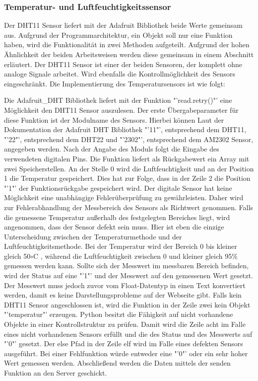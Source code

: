 \subsubsection*{Temperatur- und Luftfeuchtigkeitssensor}
	Der DHT11 Sensor liefert mit der Adafruit Bibliothek beide Werte gemeinsam aus. Aufgrund der Programmarchitektur, ein Objekt soll nur eine Funktion haben, wird die Funktionalität in zwei Methoden aufgeteilt. Aufgrund der hohen Ähnlichkeit der beiden Arbeitsweisen werden diese gemeinsam in einem Abschnitt erläutert. Der DHT11 Sensor ist einer der beiden Sensoren, der komplett ohne analoge Signale arbeitet. Wird ebenfalls die Kontrollmöglichkeit des Sensors eingeschränkt. Die Implementierung des Temperatursensors ist wie folgt:
	
	Die Adafruit\_DHT Bibliothek liefert mit der Funktion "'read.retry()"' eine Möglichkeit den DHT11 Sensor auszulesen. Der erste Übergabeparameter für diese Funktion ist der Modulname des Sensors. Hierbei können Laut der Dokumentation der Adafruit DHT Bibliothek\cite{Adafruit47:online} "'11"', entsprechend dem DHT11, "'22"', entsprechend dem DHT22 und "'2302"', entsprechend dem AM2302 Sensor, angegeben werden. Nach der Angabe des Moduls folgt die Eingabe des verwendeten digitalen Pins. Die Funktion liefert als Rückgabewert ein Array mit zwei Speicherstellen. An der Stelle 0 wird die Luftfeuchtigkeit und an der Position 1 die Temperatur gespeichert. Dies hat zur Folge, dass in der Zeile 2 die Position "'1"' der Funktionsrückgabe gespeichert wird. Der digitale Sensor hat keine Möglichkeit eine unabhängige Fehlerüberprüfung zu gewährleisten. Daher wird zur Fehlerabhandlung der Messbereich des Sensors als Richtwert genommen. Falls die gemessene Temperatur außerhalb des festgelegten Bereiches liegt, wird angenommen, dass der Sensor defekt sein muss. Hier ist eben die einzige Unterscheidung zwischen der Temperaturmethode und der Luftfeuchtigkeitsmethode. Bei der Temperatur wird der Bereich 0 bis kleiner gleich 50$\circ$C , während die Luftfeuchtigkeit zwischen 0 und kleiner gleich 95\% gemessen werden kann. Sollte sich der Messwert im messbaren Bereich befinden, wird der Status auf eine "'1"' und der Messwert auf den gemessenen Wert gesetzt. Der Messwert muss jedoch zuvor vom Float-Datentyp in einen Text konvertiert werden, damit es keine Darstellungsprobleme auf der Webseite gibt. Falls kein DHT11 Sensor angeschlossen ist, wird die Funktion in der Zeile zwei kein Objekt "'temperatur"' erzeugen. Python besitzt die Fähigkeit auf nicht vorhandene Objekte in einer Kontrollstruktur zu prüfen. Damit wird die Zeile acht im Falle eines nicht vorhandenen Sensors erfüllt und die des Status und des Messwerts auf "'0"' gesetzt. Der else Pfad in der Zeile elf wird im Falle eines defekten Sensors ausgeführt. Bei einer Fehlfunktion würde entweder eine "'0"' oder ein sehr hoher Wert gemessen werden. Abschließend werden die Daten mittels der senden Funktion an den Server geschickt.
